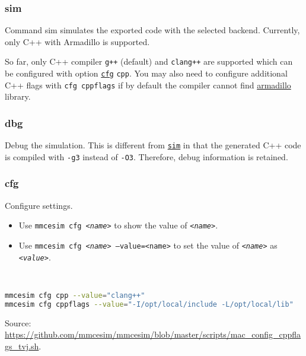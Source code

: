\subsubsection{sim}\label{d:subsec:sim}
Command sim simulates the exported code with the selected backend. Currently, only C++ with Armadillo is supported.

So far, only C++ compiler \texttt{g++} (default) and \texttt{clang++} are supported which can be configured with option \hyperref[d:subsec:cfg]{\texttt{cfg}} \texttt{cpp}.
You may also need to configure additional C++ flags with \texttt{cfg cppflags} if by default the compiler cannot find
\href{https://arma.sourceforge.net/}{armadillo}
library.

\subsubsection{dbg}\label{d:subsec:dbg}
Debug the simulation.
This is different from \hyperref[d:subsec:sim]{\texttt{sim}} in that the generated C++ code is compiled with \texttt{-g3} instead of \texttt{-O3}.
Therefore, debug information is retained.

\subsubsection{cfg}\label{d:subsec:cfg}
Configure settings.

\begin{itemize}
  \item Use \texttt{mmcesim cfg \textit{<name>}} to show the value of \texttt{\textit{<name>}}.
  \item Use \texttt{mmcesim cfg \textit{<name>} --value=\texttt{<name>}} to set the value of \texttt{\textit{<name>}} as \texttt{\textit{<value>}}.
\end{itemize}

\begin{example}[Configure C++]~
  \begin{lstlisting}[language=sh]
mmcesim cfg cpp --value="clang++"
mmcesim cfg cppflags --value="-I/opt/local/include -L/opt/local/lib"
  \end{lstlisting}
  {\small Source: \url{https://github.com/mmcesim/mmcesim/blob/master/scripts/mac_config_cppflags_tvj.sh}.}
\end{example}

